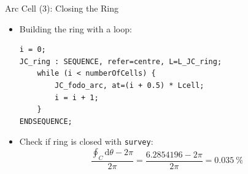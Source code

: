 \documentclass{beamer}
\begin{document}
%
%
%

\begin{frame}[t,fragile]{Arc Cell (3): Closing the Ring}
\begin{itemize}
\item Building the ring with a loop:
\begin{lstlisting}
i = 0;
JC_ring : SEQUENCE, refer=centre, L=L_JC_ring; 
    while (i < numberOfCells) {
        JC_fodo_arc, at=(i + 0.5) * Lcell;
        i = i + 1;
    }
ENDSEQUENCE;
\end{lstlisting}
\item Check if ring is closed with \texttt{survey}:
\begin{equation*}
\frac{\oint_C\text{d}\theta-2\pi}{2\pi}=\frac{\num{6.2854196}-2\pi}{2\pi}=\SI{0.035}{\percent}
\end{equation*}
\end{itemize}
\end{frame}
\end{document}
